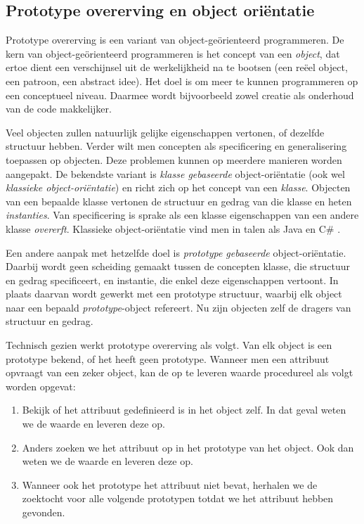 \subsection{Prototype overerving en object oriëntatie}
\label{sec:taal-prototypen}

Prototype overerving is een variant van object-geörienteerd programmeren. De kern van object-geörienteerd programmeren is het concept van een \emph{object}, dat ertoe dient een verschijnsel uit de werkelijkheid na te bootsen (een reëel object, een patroon, een abstract idee). Het doel is om meer te kunnen programmeren op een conceptueel niveau. Daarmee wordt bijvoorbeeld zowel creatie als onderhoud van de code makkelijker.

Veel objecten zullen natuurlijk gelijke eigenschappen vertonen, of dezelfde structuur hebben. Verder wilt men concepten als specificering en generalisering toepassen op objecten. Deze problemen kunnen op meerdere manieren worden aangepakt. De bekendste variant is \emph{klasse gebaseerde} object-oriëntatie (ook wel \emph{klassieke object-oriëntatie}) en richt zich op het concept van een \emph{klasse}. Objecten van een bepaalde klasse vertonen de structuur en gedrag van die klasse en heten \emph{instanties}. Van specificering is sprake als een klasse eigenschappen van een andere klasse \emph{overerft}. Klassieke object-oriëntatie vind men in talen als Java en C\# \citep{java,csharp}.

Een andere aanpak met hetzelfde doel is \emph{prototype gebaseerde} object-oriëntatie. Daarbij wordt geen scheiding gemaakt tussen de concepten klasse, die structuur en gedrag specificeert, en instantie, die enkel deze eigenschappen vertoont. In plaats daarvan wordt gewerkt met een prototype structuur, waarbij elk object naar een bepaald \emph{prototype}-object refereert. Nu zijn objecten zelf de dragers van structuur en gedrag.

Technisch gezien werkt prototype overerving als volgt. Van elk object is een prototype bekend, of het heeft geen prototype. Wanneer men een attribuut opvraagt van een zeker object, kan de op te leveren waarde procedureel als volgt worden opgevat:

\begin{enumerate}
  \item Bekijk of het attribuut gedefinieerd is in het object zelf. In dat geval weten we de waarde en leveren deze op.
  \item Anders zoeken we het attribuut op in het prototype van het object. Ook dan weten we de waarde en leveren deze op.
  \item Wanneer ook het prototype het attribuut niet bevat, herhalen we de zoektocht voor alle volgende prototypen totdat we het attribuut hebben gevonden.
\end{enumerate}


